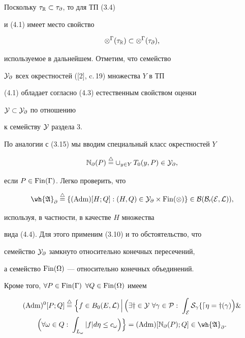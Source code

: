 Поскольку $\tau_{\Bbb R}\subset\tau_\partial$, то для ТП (3.4)


и (4.1) имеет место свойство


\begin{equation}


\otimes^\Gamma(\tau_{\Bbb R}) \subset


\otimes^\Gamma(\tau_\partial),


\end{equation}


используемое в дальнейшем. Отметим, что семейство


$\cal Y_\partial$ всех окрестностей ([2], c.\,19) множества $Y$ в ТП


(4.1) обладает согласно (4.3) естественным свойством оценки


$\cal Y\subset\cal Y_\partial$ по отношению


к семейству $\cal Y$ раздела 3.


По аналогии с (3.15) мы вводим специальный класс окрестностей $Y$


\begin{equation}


\Bbb N_\partial(P)\overset{\triangle}{=}\cup_{y \in Y}\,T_0(y,


P)\in\cal Y_\partial,


\end{equation}


если $P\in\operatorname{Fin}(\Gamma)$. Легко проверить, что


\begin{equation}


\wh{\frak A}_\partial\overset{\triangle}{=}{}


\{(\Adm)[H;Q]:(H,Q)\in\cal Y_\partial\times


\Fin(\Omega)\}\in\cal B(B_0(E,\cal L)),


\end{equation}


используя, в частности, в качестве $H$ множества


вида (4.4). Для этого применим (3.10) и то обстоятельство, что


семейство $\cal Y_\partial$ замкнуто относительно конечных пересечений,


а семейство $\operatorname{Fin}(\Omega)$ --- относительно конечных объединений.


Кроме того, $\forall P\in\operatorname{Fin}(\Gamma)$ $\forall Q\in\operatorname{Fin}(\Omega)$ имеем


\begin{multline}


(\Adm)^0[P;Q]\overset{\triangle}{=}{}\Big\{f\in B_0(E,\cal L)\,\Big|\,


\Big(\exists y\in Y\ \forall\gamma\in P:\;\int_E S_\gamma f d\eta=


y(\gamma)\Big) \&\\


%


\Big(\forall\omega\in Q:\;


\int_{L_\omega}|f|d\eta\le c_\omega\Big)\Big\} =


(\Adm)[\Bbb N_\partial(P);Q]\in\wh{\frak A}_\partial.


\end{multline}


